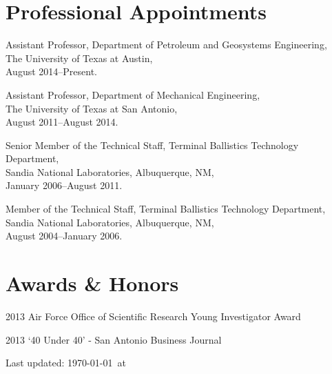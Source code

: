 \documentclass[12pt,letterpaper]{article}
\def\HCode#1{}
\renewenvironment{itemize}{
  \begin{list}{}{
    \setlength{\leftmargin}{1.5em}
    \setlength{\itemsep}{0.25em}
    \setlength{\parskip}{0pt}
    \setlength{\parsep}{0.25em}
  }
}{
  \end{list}
}
\begin{document}
\section*{Professional Appointments}

\begin{itemize}
    \item Assistant Professor, Department of Petroleum and Geosystems Engineering, \\ The University of Texas at Austin,\\
  August 2014--Present. 
\item Assistant Professor, Department of Mechanical Engineering, \\ The University of Texas at San Antonio,\\
  August 2011--August 2014. 


\item Senior Member of the Technical Staff, Terminal Ballistics Technology Department, \\ Sandia National Laboratories, Albuquerque, NM, \\ January 2006--August 2011.

\item Member of the Technical Staff, Terminal Ballistics Technology Department, \\ Sandia National Laboratories, Albuquerque, NM, \\ August 2004--January 2006.
\end{itemize}

\section*{Awards \& Honors}
\begin{itemize}
\item 2013 Air Force Office of Scientific Research Young Investigator Award
\item 2013 `40 Under 40' - San Antonio Business Journal
\end{itemize}









%

%

\vfill 
\HCode{<center>}
\begin{center}
  \begin{small}
    Last updated: \today\ at \currenttime
  \end{small}
\end{center}
\HCode{</center>}



\HCode{</div>}
\HCode{</div>}
\end{document}
